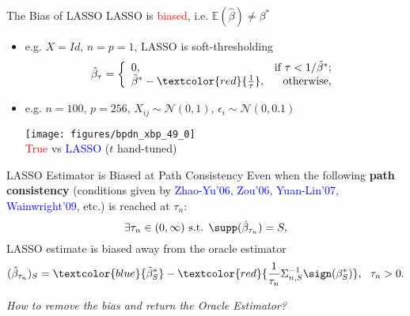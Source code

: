 \documentclass[slidestop,compress,9pt,epsfig,color]{beamer}
\providecommand{\Nm}{\mathcal{N}}
\providecommand{\E}{\mathbb{E}}
\theoremstyle{example}
\begin{document}
\begin{frame}{The Bias of LASSO}
LASSO is \textcolor{red}{biased}, i.e. $\E(\hat{\beta})\neq \beta^*$
\begin{itemize}
\item e.g. $X=Id$, $n=p=1$, LASSO is soft-thresholding
\begin{equation*}\label{eq:lasso1}
\hat{\beta}_{\tau}=\left\{
\begin{array}{lr}
0,& \mbox{if $\tau<1/\tilde{\beta}^* $}; \\
\tilde{\beta}^* - \textcolor{red}{\frac{1}{\tau}},& \mbox{otherwise},
\end{array}
\right.
\end{equation*}
\item e.g. $n=100$, $p=256$, $X_{ij}\sim \Nm(0,1)$, $\epsilon_i\sim \Nm(0,0.1)$
\begin{center}
      \begin{minipage}[b]{0.4\textwidth}
       \centering
      \texttt{[image: figures/bpdn\_xbp\_49\_0]}\\
      \textcolor{red}{True} vs \textcolor{blue}{LASSO} ($t$ hand-tuned)
     \end{minipage}
\end{center}
\end{itemize}
\end{frame}


\begin{frame}{LASSO Estimator is Biased at Path Consistency}
Even when the following \textbf{path consistency} (conditions given by \textcolor{blue}{Zhao-Yu'06, Zou'06, Yuan-Lin'07, Wainwright'09}, etc.) is reached at $\tau_n$: 
$$\exists \tau_n\in (0,\infty) \mbox{   s.t.   } \supp(\hat{\beta}_{\tau_n}) = S,$$
LASSO estimate is biased away from the oracle estimator 
\[ (\hat{\beta}_{\tau_n})_S =  \textcolor{blue}{\tilde{\beta}^*_S} - \textcolor{red}{\frac{1}{\tau_n}\Sigma_{n,S}^{-1} \sign(\beta^*_S)}, \ \ \tau_n>0.\]

\emph{How to remove the bias and return the Oracle Estimator?}
\end{frame}
\end{document}
